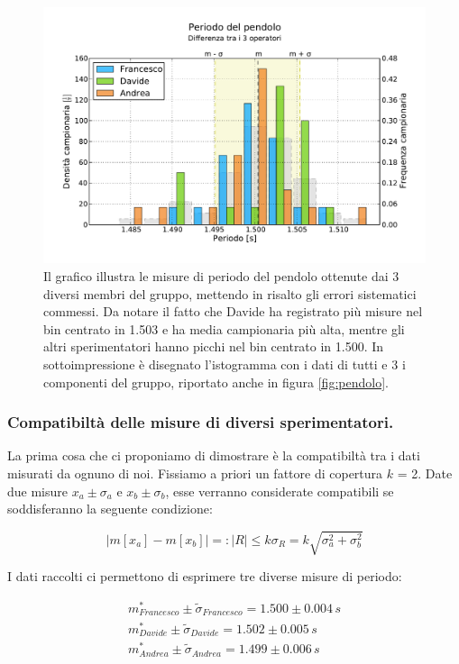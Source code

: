 \begin{figure}[bt]
	\centering
	\includegraphics[width=150mm]{grafici/pendolo3.pdf}
	\caption{Il grafico illustra le misure di periodo del pendolo ottenute
        dai 3 diversi membri del gruppo, mettendo in risalto gli errori
        sistematici commessi. Da notare il fatto che Davide ha registrato più
        misure nel bin centrato in 1.503 e ha media campionaria più alta, mentre gli
        altri sperimentatori hanno picchi nel bin centrato in 1.500. In sottoimpressione
        è disegnato l'istogramma con i dati di tutti e 3 i componenti del gruppo, riportato
        anche in figura \ref{fig:pendolo}.}
    \label{fig:pendolo3}
\end{figure}

\subsubsection{Compatibiltà delle misure di diversi sperimentatori.}

La prima cosa che ci proponiamo di dimostrare è la compatibiltà
tra i dati misurati da ognuno di noi. Fissiamo a priori un fattore
di copertura $k$ = 2. Date due misure $x_a \pm \sigma_a$ e $x_b \pm \sigma_b$,
esse verranno considerate compatibili se soddisferanno la seguente condizione:

\begin{equation*}
    |m[x_a] - m[x_b]| =: |R| \leq k\sigma_R = k\sqrt{\sigma_a^2 + \sigma_b^2}
\end{equation*}

I dati raccolti ci permettono di esprimere tre diverse misure di periodo:

\begin{equation*}
	\begin{split}
		m_{Francesco}^* \pm \tilde{\sigma}_{Francesco}  = 1.500 \pm 0.004\,s \\
		m_{Davide}^* \pm \tilde{\sigma}_{Davide} = 1.502 \pm 0.005\,s \\
		m_{Andrea}^* \pm \tilde{\sigma}_{Andrea} = 1.499 \pm 0.006\,s
	\end{split}
\end{equation*}

